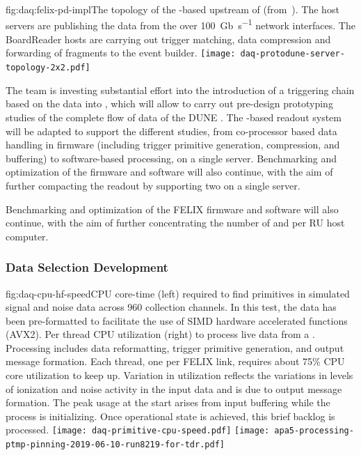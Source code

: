 \begin{dunefigure}{fig:daq:felix-pd-impl}{The topology of the -based
    upstream  of  (from~\cite{pdsp-felix}). The  host servers are publishing the data from the  over \SI{100}{Gb\per\second} network interfaces. The BoardReader hosts are carrying out trigger matching, data compression and forwarding of fragments to the event builder.}
 \texttt{[image: daq-protodune-server-topology-2x2.pdf]}
\end{dunefigure}

The  team is investing substantial effort into the introduction of
a triggering chain based on the  data into , which will
allow to carry out pre-design prototyping studies of the complete flow
of data of the DUNE .  
The -based readout system will be adapted to support the
different studies, from co-processor based data handling in firmware
(including trigger primitive generation, compression, and buffering) to software-based processing, on a single
server. Benchmarking and optimization of the  firmware and
software will also continue, with the aim of further compacting the
readout by supporting two  on a single server. 


Benchmarking and optimization of the FELIX firmware and software will also
continue, with the aim of further concentrating the number of  and
 per RU host computer.


\subsubsection{Data Selection Development}
\begin{dunefigure}{fig:daq-cpu-hf-speed}{CPU core-time (left) required to find primitives in simulated signal and noise data across 960 collection channels.
    In this test, the data has been pre-formatted to facilitate the use of SIMD hardware accelerated functions (AVX2). 
    Per thread CPU utilization (right) to process live data from a  .
    Processing includes data reformatting, trigger primitive generation, and output message formation.
    Each thread, one per FELIX link, requires about 75\% CPU core utilization to keep up.
    Variation in utilization reflects the variations in levels of ionization and noise activity in the input data and is due to output message formation.
    The peak usage at the start arises from input buffering while the process is initializing. 
    Once operational state is achieved, this brief backlog is processed.}
  \texttt{[image: daq-primitive-cpu-speed.pdf]}%
 \texttt{[image: apa5-processing-ptmp-pinning-2019-06-10-run8219-for-tdr.pdf]}
\end{dunefigure}

